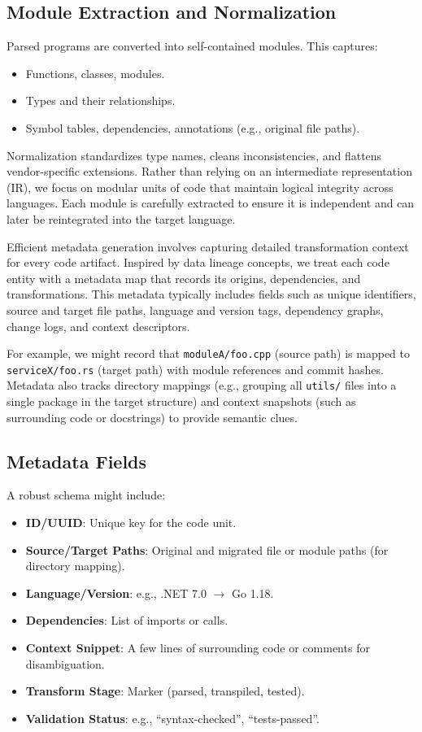 \documentclass[twocolumn]{article}
\begin{document}
\subsection{Module Extraction and Normalization}

Parsed programs are converted into self-contained modules. This captures:

\begin{itemize}
    \item Functions, classes, modules.
    \item Types and their relationships.
    \item Symbol tables, dependencies, annotations (e.g., original file paths).
\end{itemize}

Normalization standardizes type names, cleans inconsistencies, and flattens vendor-specific extensions. Rather than relying on an intermediate representation (IR), we focus on modular units of code that maintain logical integrity across languages. Each module is carefully extracted to ensure it is independent and can later be reintegrated into the target language.

Efficient metadata generation involves capturing detailed transformation context for every code artifact. Inspired by data lineage concepts, we treat each code entity with a metadata map that records its origins, dependencies, and transformations. This metadata typically includes fields such as unique identifiers, source and target file paths, language and version tags, dependency graphs, change logs, and context descriptors. 

For example, we might record that \texttt{moduleA/foo.cpp} (source path) is mapped to \texttt{serviceX/foo.rs} (target path) with module references and commit hashes. Metadata also tracks directory mappings (e.g., grouping all \texttt{utils/} files into a single package in the target structure) and context snapshots (such as surrounding code or docstrings) to provide semantic clues.

\subsection*{Metadata Fields}

A robust schema might include:

\begin{itemize}
    \item \textbf{ID/UUID}: Unique key for the code unit.
    \item \textbf{Source/Target Paths}: Original and migrated file or module paths (for directory mapping).
    \item \textbf{Language/Version}: e.g., .NET 7.0 $\rightarrow$ Go 1.18.
    \item \textbf{Dependencies}: List of imports or calls.
    \item \textbf{Context Snippet}: A few lines of surrounding code or comments for disambiguation.
    \item \textbf{Transform Stage}: Marker (parsed, transpiled, tested).
    \item \textbf{Validation Status}: e.g., ``syntax-checked'', ``tests-passed''.
\end{itemize}
\end{document}
